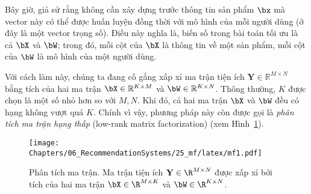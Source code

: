 Bây giờ, giả sử rằng không cần xây dựng trước thông tin sản phẩm
$\bx$ mà vector này có thể được huấn luyện đồng thời với mô hình của mỗi người dùng (ở đây là một vector trọng số). Điều này nghĩa là, biến số trong bài toán tối ưu là cả
$\bX$ và $\bW$; trong đó,
mỗi cột của $\bX$ là thông tin về một sản phẩm, mỗi cột của $\bW$ là mô hình của một người dùng. 

 
Với cách làm này, chúng ta đang cố gắng xấp xỉ ma trận tiện ích $\mathbf{Y} \in
\mathbb{R}^{M \times N}$ bằng tích của hai ma trận $\bX\in
\mathbb{R}^{K\times M}$ và $\bW \in \mathbb{R}^{K \times N}$. Thông
thường, $K$ được chọn là một số nhỏ hơn so với $M, N$. Khi đó, cả hai
ma trận $\bX$ và $\bW$ đều có hạng không vượt quá $K$. Chính vì
vậy, phương pháp này còn được gọi là \textit{phân tích ma trận hạng thấp} ({low-rank matrix factorization}) (xem
Hình~\ref{fig:25_1}).
\begin{figure}[t]
\centering
    \texttt{[image: Chapters/06\_RecommendationSystems/25\_mf/latex/mf1.pdf]}
    \caption[]{Phân tích ma trận. Ma trận tiện ích $\mathbf{Y} \in
    \R^{M\times N}$ được
    xấp xỉ bởi tích của hai ma trận $\bX \in \R^{M\times K}$ và
    $\bW \in \R^{K\times N}$.}
    \label{fig:25_1}
\end{figure}
 
